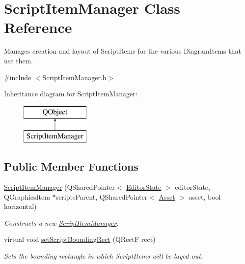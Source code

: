 \hypertarget{class_script_item_manager}{\section{Script\-Item\-Manager Class Reference}
\label{class_script_item_manager}
}


Manages creation and layout of Script\-Items for the various Diagram\-Items that use them.  




{\ttfamily \#include $<$Script\-Item\-Manager.\-h$>$}

Inheritance diagram for Script\-Item\-Manager\-:\begin{figure}[H]
\begin{center}
\leavevmode
\includegraphics[height=2.000000cm]{class_script_item_manager}
\end{center}
\end{figure}
\subsection*{Public Member Functions}
\begin{DoxyCompactItemize}
\item 
\hyperlink{class_script_item_manager_ae6864baaa9e9d07e94129d8b86b39b3a}{Script\-Item\-Manager} (Q\-Shared\-Pointer$<$ \hyperlink{class_editor_state}{Editor\-State} $>$ editor\-State, Q\-Graphics\-Item $\ast$scripts\-Parent, Q\-Shared\-Pointer$<$ \hyperlink{class_picto_1_1_asset}{Asset} $>$ asset, bool horizontal)
\begin{DoxyCompactList}\small\item\em Constructs a new \hyperlink{class_script_item_manager}{Script\-Item\-Manager}. \end{DoxyCompactList}\item 
virtual void \hyperlink{class_script_item_manager_a0328456c18f63cad615465088fce1231}{set\-Script\-Bounding\-Rect} (Q\-Rect\-F rect)
\begin{DoxyCompactList}\small\item\em Sets the bounding rectangle in which Script\-Items will be layed out. \end{DoxyCompactList}\end{DoxyCompactItemize}



